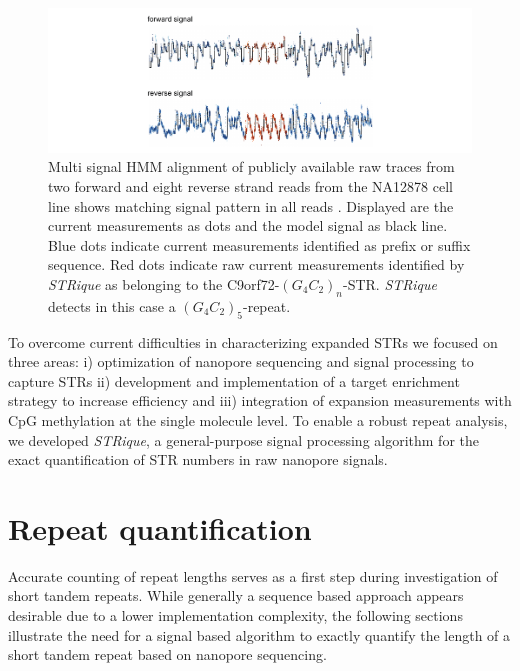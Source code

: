 \begin{figure}[h]
	\centering
	\includegraphics[width=1.0\textwidth]{figures/strique/signal.pdf}
	\captionsetup{format=plain}
	\caption[Nanopore raw signal of the C9orf72 STR in NA12878 cells]{Multi signal HMM alignment of publicly available raw traces from two forward and eight reverse strand reads from the NA12878 cell line shows matching signal pattern in all reads \cite{Jain2018}. Displayed are the current measurements as dots and the model signal as black line. Blue dots indicate current measurements identified as prefix or suffix sequence. Red dots indicate raw current measurements identified by \textit{STRique} as belonging to the C9orf72-$ (G_{4}C_{2})_{n} $-STR. \textit{STRique} detects in this case a $ (G_{4}C_{2})_{5} $-repeat.}
	\label{fig:strique:signal}
\end{figure}


To overcome current difficulties in characterizing expanded STRs we focused on three areas: i) optimization of nanopore sequencing and signal processing to capture STRs ii) development and implementation of a target enrichment strategy to increase efficiency and iii) integration of expansion measurements with CpG methylation at the single molecule level.
To enable a robust repeat analysis, we developed \textit{STRique}, a general-purpose signal processing algorithm for the exact quantification of STR numbers in raw nanopore signals.





\section{Repeat quantification}
\label{sec:strique:quantification}

Accurate counting of repeat lengths serves as a first step during investigation of short tandem repeats. While generally a sequence based approach appears desirable due to a lower implementation complexity, the following sections illustrate the need for a signal based algorithm to exactly quantify the length of a short tandem repeat based on nanopore sequencing.


